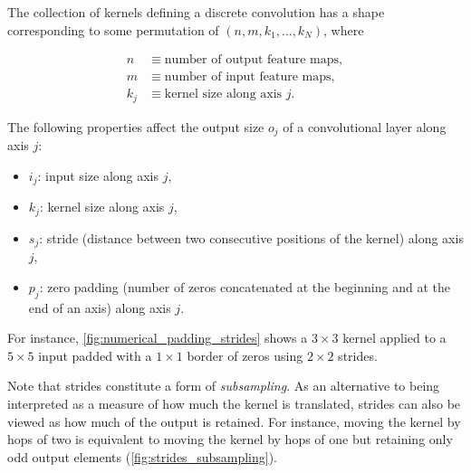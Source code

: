 The collection of kernels defining a discrete convolution has a shape
corresponding to some permutation of $(n, m, k_1, \ldots, k_N)$, where

\begin{equation*}
\begin{split}
    n &\equiv \text{number of output feature maps},\\
    m &\equiv \text{number of input feature maps},\\
    k_j &\equiv \text{kernel size along axis $j$}.
\end{split}
\end{equation*}

The following properties affect the output size $o_j$ of a convolutional layer
along axis $j$:

\begin{itemize}
    \item $i_j$: input size along axis $j$,
    \item $k_j$: kernel size along axis $j$,
    \item $s_j$: stride (distance between two consecutive positions of the
        kernel) along axis $j$,
    \item $p_j$: zero padding (number of zeros concatenated at the beginning and
        at the end of an axis) along axis $j$.
\end{itemize}

\noindent For instance, \autoref{fig:numerical_padding_strides} shows a $3
\times 3$ kernel applied to a $5 \times 5$ input padded with a $1 \times 1$
border of zeros using $2 \times 2$ strides.

Note that strides constitute a form of \emph{subsampling}. As an alternative to
being interpreted as a measure of how much the kernel is translated, strides
can also be viewed as how much of the output is retained. For instance, moving
the kernel by hops of two is equivalent to moving the kernel by hops of one but
retaining only odd output elements (\autoref{fig:strides_subsampling}).

